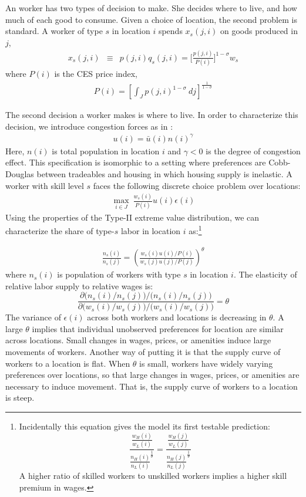 \documentclass{article}
\begin{document}
An worker has two types of decision to make.  She decides where to live, and how much of each good to consume.  Given a choice of location, the second problem is standard.  A worker of type $s$ in location $i$ spends $x_s(j,i)$ on goods produced in $j$,
\begin{eqnarray}\label{eq:x_s}
	x_s(j,i) & \equiv & p(j,i) q_s(j,i) = \Big[ \frac{p(j,i)}{P(i)} \Big]^{1-\sigma} w_s
\end{eqnarray}
where $P(i)$ is the CES price index,
\begin{eqnarray}\label{eq:price_index}
	P(i) = \left[\int_J p(j,i)^{1-\sigma}~ dj\right]^{\frac{1}{1-\sigma}}
\end{eqnarray}

The second decision a worker makes is where to live.  In order to characterize this decision, we introduce congestion forces as in \citet{allen2014trade}:
\begin{eqnarray}\label{eq:congestion}
u(i) = \bar{u}(i)  n(i)^{\gamma}
\end{eqnarray}
Here, $n(i)$ is total population in location $i$ and $\gamma<0$ is the degree of congestion effect. This specification is isomorphic to a setting where preferences are Cobb-Douglas between tradeables and housing in which housing supply is inelastic.
A worker with skill level $s$ faces the following discrete choice problem over locations:
\begin{eqnarray} 
\max_{i \in J}~ \frac{w_s(i)}{P(i)}u(i) \epsilon(i)  \nonumber
\end{eqnarray}
Using the properties of the Type-II extreme value distribution, we can characterize the share of type-$s$ labor in location $i$ as:\footnote{Incidentally this equation gives the model its first testable prediction:
    \begin{equation*}
        \frac{\frac{w_H(i)}{w_L(i)}}{\frac{n_H(i)}{n_L(i)}^\frac{1}{\theta}} = \frac{\frac{w_H(j)}{w_L(j)}}{\frac{n_H(j)}{n_L(j)}^\frac{1}{\theta}}
    \end{equation*}
    A higher ratio of skilled workers to unskilled workers implies a higher skill premium in wages.}
    

\begin{eqnarray}
    \frac{n_s(i)}{n_s(j)} = \left(
	\frac{w_s(i)u(i)/P(i)}
	{w_s(j)u(j) /P(j)}\right)^\theta
    \label{eq:rel_pops}
\end{eqnarray} 
where $n_s(i)$ is population of workers with type $s$ in location $i$.
The elasticity of relative labor supply to relative wages is:
\[
\frac{ \partial \Big(n_s(i)/n_s(j)\Big) \Big/
\Big(n_s(i)/n_s(j)\Big)}
{\partial \Big(w_s(i)/w_s(j)\Big) \Big/
\Big(w_s(i)/w_s(j)\Big) } = \theta
\]
The variance of $\epsilon(i)$ across both workers and locations is decreasing in $\theta$. A large $\theta$ implies that individual unobserved preferences for location are similar across locations. Small changes in wages, prices, or amenities induce large movements of workers.  Another way of putting it is that the supply curve of workers to a location is flat.  When $\theta$ is small, workers have widely varying preferences over locations, so that large changes in wages, prices, or amenities are necessary to induce movement.  That is, the supply curve of workers to a location is steep.
\end{document}
